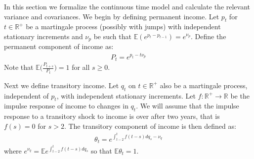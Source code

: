 
In this section we formalize the continuous time model and calculate the relevant variance and covariances. We begin by defining permanent income. Let $p_t$ for $t \in \mathbb{R}^+$ be a martingale process (possibly with jumps) with independent stationary increments and $\nu_p$ be such that $\mathbb{E}(e^{p_t-p_{t-1}})=e^{\nu_p}$. Define the permanent component of income as:
\begin{align*}
P_t = e^{p_t - t\nu_p}
\end{align*}
Note that $\mathbb{E}\Big(\frac{P_{t+s}}{P_t}\Big)=1$ for all $s\geq 0$.

Next we define transitory income. Let $q_t$ on $t \in \mathbb{R}^+$ also be a martingale process, independent of $p_t$, with independent stationary increments. Let $f:\mathbb{R}^+ \rightarrow \mathbb{R}$ be the impulse response of income to changes in $q_t$. We will assume that the impulse response to a transitory shock to income is over after two years, that is $f(s)=0$ for $s>2$. The transitory component of income is then defined as:
\begin{align*}
\theta_t =  e^{\int_{t-2}^{t} f(t-s)dq_s -\nu_q} 
\end{align*}
where $e^{\nu_q } = \mathbb{E}e^{\int_{t-2}^{t} f(t-s)dq_s}$ so that $\mathbb{E}\theta_t=1$.

